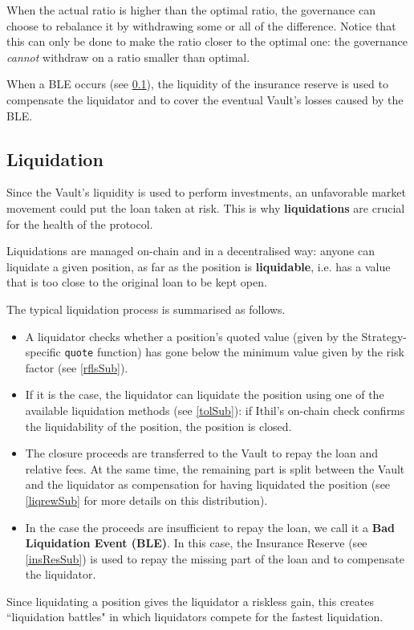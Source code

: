 \documentclass[a4paper,10 pt]{article}
\theoremstyle{definition}
\begin{document}
When the actual ratio is higher than the optimal ratio, the governance can choose to rebalance it by withdrawing some or all of the difference. Notice that this can only be done to make the ratio closer to the optimal one: the governance {\it cannot} withdraw on a ratio smaller than optimal.

When a BLE occurs (see \ref{liqSub0}), the liquidity of the insurance reserve is used to compensate the liquidator and to cover the eventual Vault's losses caused by the BLE.

\subsection{Liquidation}\label{liqSub0}
Since the Vault's liquidity is used to perform investments, an unfavorable market movement could put the loan taken at risk. This is why {\bf liquidations} are crucial for the health of the protocol.

Liquidations are managed on-chain and in a decentralised way: anyone can liquidate a given position, as far as the position is {\bf liquidable}, i.e. has a value that is too close to the original loan to be kept open.

The typical liquidation process is summarised as follows.
\begin{itemize}
\item A liquidator checks whether a position's quoted value (given by the Strategy-specific \verb|quote| function) has gone below the minimum value given by the risk factor (see \ref{rflsSub}).
\item If it is the case, the liquidator can liquidate the position using one of the available liquidation methods (see \ref{tolSub}): if Ithil's on-chain check confirms the liquidability of the position, the position is closed.
\item The closure proceeds are transferred to the Vault to repay the loan and relative fees. At the same time, the remaining part is split between the Vault and the liquidator as compensation for having liquidated the position (see \ref{liqrewSub} for more details on this distribution).
\item In the case the proceeds are insufficient to repay the loan, we call it a {\bf Bad Liquidation Event (BLE)}. In this case, the Insurance Reserve (see \ref{insResSub}) is used to repay the missing part of the loan and to compensate the liquidator.
\end{itemize}

Since liquidating a position gives the liquidator a riskless gain, this creates ``liquidation battles" in which liquidators compete for the fastest liquidation.
\end{document}
